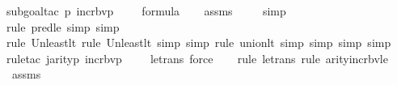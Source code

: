 \begin{isabellebody}
{\isacharparenleft}{\kern0pt}subgoal{\isacharunderscore}{\kern0pt}tac\ {\isachardoublequoteopen}{\isacharparenleft}{\kern0pt}{\isasymlambda}p{\isachardot}{\kern0pt}\ incr{\isacharunderscore}{\kern0pt}bv{\isacharparenleft}{\kern0pt}p{\isacharparenright}{\kern0pt}\ {\isacharbackquote}{\kern0pt}\ {}{\isacharparenright}{\kern0pt}{\isacharcircum}{\kern0pt}{}\ {\isacharparenleft}{\kern0pt}{\isasymphi}{\isacharparenright}{\kern0pt}\ {\isasymin}\ formula{\isachardoublequoteclose}{\isacharparenright}{\kern0pt}\isanewline
\ \ \isamarkupfalse%
\ assms\isanewline
\ \ \ \isamarkupfalse%
\ simp\isanewline
\ \ \ \isamarkupfalse%
{\isacharparenleft}{\kern0pt}rule\ pred{\isacharunderscore}{\kern0pt}le{\isacharcomma}{\kern0pt}\ simp{\isacharcomma}{\kern0pt}\ simp{\isacharparenright}{\kern0pt}{\isacharplus}{\kern0pt}\isanewline
\ \ \ \isamarkupfalse%
{\isacharparenleft}{\kern0pt}rule\ Un{\isacharunderscore}{\kern0pt}least{\isacharunderscore}{\kern0pt}lt{\isacharcomma}{\kern0pt}\ rule\ Un{\isacharunderscore}{\kern0pt}least{\isacharunderscore}{\kern0pt}lt{\isacharcomma}{\kern0pt}\ simp{\isacharcomma}{\kern0pt}\ simp{\isacharcomma}{\kern0pt}\ rule\ union{\isacharunderscore}{\kern0pt}lt{}{\isacharcomma}{\kern0pt}\ simp{\isacharcomma}{\kern0pt}\ simp{\isacharcomma}{\kern0pt}\ simp{\isacharcomma}{\kern0pt}\ simp{\isacharparenright}{\kern0pt}{\isacharplus}{\kern0pt}\isanewline
\ \ \ \isamarkupfalse%
{\isacharparenleft}{\kern0pt}rule{\isacharunderscore}{\kern0pt}tac\ j{\isacharequal}{\kern0pt}{\isachardoublequoteopen}arity{\isacharparenleft}{\kern0pt}{\isacharparenleft}{\kern0pt}{\isasymlambda}p{\isachardot}{\kern0pt}\ incr{\isacharunderscore}{\kern0pt}bv{\isacharparenleft}{\kern0pt}p{\isacharparenright}{\kern0pt}\ {\isacharbackquote}{\kern0pt}\ {}{\isacharparenright}{\kern0pt}{\isacharcircum}{\kern0pt}{}\ {\isacharparenleft}{\kern0pt}{\isasymphi}{\isacharparenright}{\kern0pt}{\isacharparenright}{\kern0pt}{\isachardoublequoteclose}\ \ le{\isacharunderscore}{\kern0pt}trans{\isacharcomma}{\kern0pt}\ force{\isacharparenright}{\kern0pt}\isanewline
\ \ \ \isamarkupfalse%
{\isacharparenleft}{\kern0pt}rule\ le{\isacharunderscore}{\kern0pt}trans{\isacharcomma}{\kern0pt}\ rule\ arity{\isacharunderscore}{\kern0pt}incr{\isacharunderscore}{\kern0pt}bv{\isacharunderscore}{\kern0pt}le{\isacharparenright}{\kern0pt}\isanewline
\ \ \isamarkupfalse%
\ assms\isanewline
\ \ \ \ \ \ \isamarkupfalse%

\end{isabellebody}
